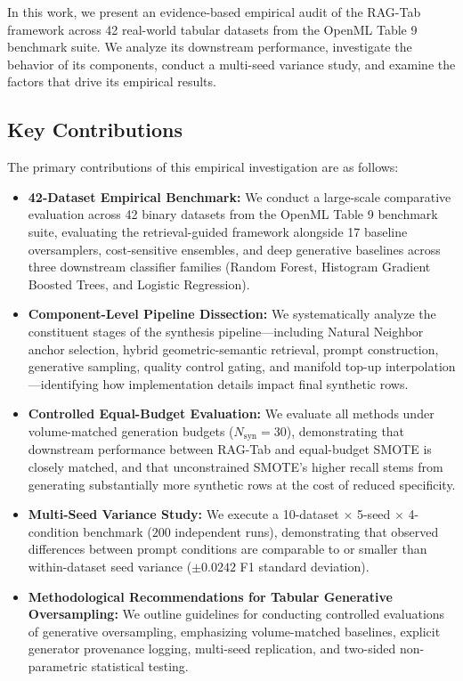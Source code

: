 \documentclass[sn-basic]{sn-jnl}
\begin{document}
In this work, we present an evidence-based empirical audit of the RAG-Tab framework across 42 real-world tabular datasets from the OpenML Table 9 benchmark suite. We analyze its downstream performance, investigate the behavior of its components, conduct a multi-seed variance study, and examine the factors that drive its empirical results.

\subsection{Key Contributions}
The primary contributions of this empirical investigation are as follows:
\begin{itemize}
    \item \textbf{42-Dataset Empirical Benchmark:} We conduct a large-scale comparative evaluation across 42 binary datasets from the OpenML Table 9 benchmark suite, evaluating the retrieval-guided framework alongside 17 baseline oversamplers, cost-sensitive ensembles, and deep generative baselines across three downstream classifier families (Random Forest, Histogram Gradient Boosted Trees, and Logistic Regression).
    \item \textbf{Component-Level Pipeline Dissection:} We systematically analyze the constituent stages of the synthesis pipeline---including Natural Neighbor anchor selection, hybrid geometric-semantic retrieval, prompt construction, generative sampling, quality control gating, and manifold top-up interpolation---identifying how implementation details impact final synthetic rows.
    \item \textbf{Controlled Equal-Budget Evaluation:} We evaluate all methods under volume-matched generation budgets ($N_{\text{syn}} = 30$), demonstrating that downstream performance between RAG-Tab and equal-budget SMOTE is closely matched, and that unconstrained SMOTE's higher recall stems from generating substantially more synthetic rows at the cost of reduced specificity.
    \item \textbf{Multi-Seed Variance Study:} We execute a 10-dataset $\times$ 5-seed $\times$ 4-condition benchmark ($200$ independent runs), demonstrating that observed differences between prompt conditions are comparable to or smaller than within-dataset seed variance ($\pm 0.0242$ F1 standard deviation).
    \item \textbf{Methodological Recommendations for Tabular Generative Oversampling:} We outline guidelines for conducting controlled evaluations of generative oversampling, emphasizing volume-matched baselines, explicit generator provenance logging, multi-seed replication, and two-sided non-parametric statistical testing.
\end{itemize}
\end{document}
